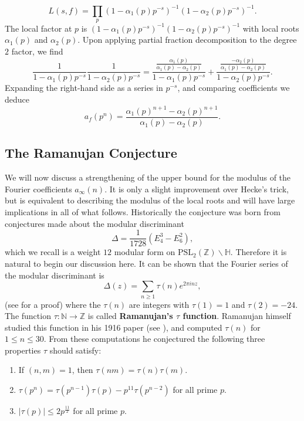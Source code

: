 \documentclass[12pt]{book}
\theoremstyle{definition}\newframedtheorem{method}{Method}
\newcommand{\PSL}{\mathrm{PSL}}
\newcommand{\N}{\mathbb{N}}
\newcommand{\Z}{\mathbb{Z}}
\renewcommand{\H}{\mathbb{H}}
\renewcommand{\a}{\alpha}
\newcommand{\<}{\langle}
\renewcommand{\>}{\rangle}
\begin{document}
      \[
        L(s,f) = \prod_{p}(1-\a_{1}(p)p^{-s})^{-1}(1-\a_{2}(p)p^{-s})^{-1}.
      \]
      The local factor at $p$ is $(1-\a_{1}(p)p^{-s})^{-1}(1-\a_{2}(p)p^{-s})^{-1}$ with local roots $\a_{1}(p)$ and $\a_{2}(p)$. Upon applying partial fraction decomposition to the degree $2$ factor, we find
      \[
        \frac{1}{1-\a_{1}(p)p^{-s}}\frac{1}{1-\a_{2}(p)p^{-s}} = \frac{\frac{\a_{1}(p)}{\a_{1}(p)-\a_{2}(p)}}{1-\a_{1}(p)p^{-s}}+\frac{\frac{-\a_{2}(p)}{\a_{1}(p)-\a_{2}(p)}}{1-\a_{2}(p)p^{-s}}.
      \]
      Expanding the right-hand side as a series in $p^{-s}$, and comparing coefficients we deduce
      \begin{equation}\label{equ:Satake_coefficient_formula}
        a_{f}(p^{n}) = \frac{\a_{1}(p)^{n+1}-\a_{2}(p)^{n+1}}{\a_{1}(p)-\a_{2}(p)}.
      \end{equation}
    \subsection*{The Ramanujan Conjecture}
      We will now discuss a strengthening of the upper bound for the modulus of the Fourier coefficients $a_{\infty}(n)$. It is only a slight improvement over Hecke's trick, but is equivalent to describing the modulus of the local roots and will have large implications in all of what follows. Historically the conjecture was born from conjectures made about the modular discriminant
      \[
        \Delta = \frac{1}{1728}(E_{4}^{3}-E_{6}^{2}),
      \]
      which we recall is a weight $12$ modular form on $\PSL_{2}(\Z)\backslash\H$. Therefore it is natural to begin our discussion here. It can be shown that the Fourier series of the modular discriminant is
      \[
        \Delta(z) = \sum_{n \ge 1}\tau(n)e^{2\pi i nz},
      \]
      (see \cite{apostol1998introduction} for a proof) where the $\tau(n)$ are integers with $\tau(1) = 1$ and $\tau(2) = -24$. The function $\tau:\N \to \Z$ is called \textbf{Ramanujan's $\tau$ function}. Ramanujan himself studied this function in his 1916 paper (see \cite{ramanujan1916certain}), and computed $\tau(n)$ for $1 \le n \le 30$. From these computations he conjectured the following three properties $\tau$ should satisfy:
      \begin{enumerate}[label=(\roman*)]
        \item If $(n,m) = 1$, then $\tau(nm) = \tau(n)\tau(m)$.
        \item $\tau(p^{n}) = \tau(p^{n-1})\tau(p)-p^{11}\tau(p^{n-2})$ for all prime $p$.
        \item $|\tau(p)| \le 2p^{\frac{11}{2}}$ for all prime $p$.
      \end{enumerate}
\end{document}
